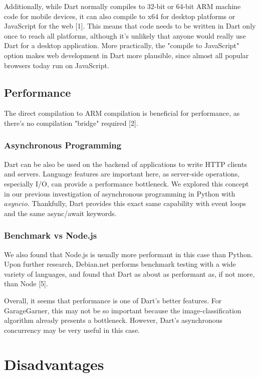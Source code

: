 Additionally, while Dart normally compiles to 32-bit or 64-bit ARM machine code for mobile devices, it can also compile to x64 for desktop  
platforms or JavaScript for the web [1]. This means that code needs to be written in Dart only once to reach all platforms, although it's
unlikely that anyone would really use Dart for a desktop application. More practically, the "compile to JavaScript" option makes web development in Dart more plausible,
since almost all popular browsers today run on JavaScript. 

\subsection{Performance}

The direct compilation to ARM compilation is beneficial for performance,
as there's no compilation "bridge" required [2]. 

\subsubsection{Asynchronous Programming}
Dart can be also be used on the backend of applications to write HTTP clients and servers. Language features are important here, as server-side operations, 
especially I/O, can provide a performance bottleneck. We explored this concept in our previous 
investigation of asynchronous programming in Python with $asyncio$. Thankfully, Dart provides this exact same capability with event loops and the same async/await keywords. 

\subsubsection{Benchmark vs Node.js}
We also found that Node.js is usually more performant in this case than Python. Upon further research, Debian.net
performs benchmark testing with a wide variety of languages, and found that Dart as about as performant as, if not more, than Node [5]. 

Overall, it seems that performance is one of Dart's better features. For GarageGarner, this may not be so important because the 
image-classification algorithm already presents a bottleneck. However, Dart's asynchronous concurrency may be very useful in this case. 
 
\section{Disadvantages}

